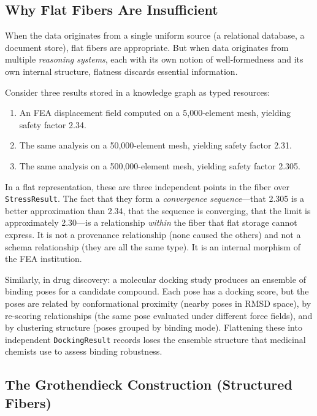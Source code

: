 \documentclass[10pt,twocolumn,letterpaper]{article}
\newcommand{\code}[1]{\texttt{\small #1}}
\begin{document}
\subsection{Why Flat Fibers Are Insufficient}

When the data originates from a single uniform source (a relational database, a document store), flat fibers are appropriate.
But when data originates from multiple \emph{reasoning systems}, each with its own notion of well-formedness and its own internal structure, flatness discards essential information.

Consider three results stored in a knowledge graph as typed resources:

\begin{enumerate}
\item An FEA displacement field computed on a 5{,}000-element mesh, yielding safety factor 2.34.
\item The same analysis on a 50{,}000-element mesh, yielding safety factor 2.31.
\item The same analysis on a 500{,}000-element mesh, yielding safety factor 2.305.
\end{enumerate}

In a flat representation, these are three independent points in the fiber over \code{StressResult}.
The fact that they form a \emph{convergence sequence}---that 2.305 is a better approximation than 2.34, that the sequence is converging, that the limit is approximately 2.30---is a relationship \emph{within} the fiber that flat storage cannot express.
It is not a provenance relationship (none caused the others) and not a schema relationship (they are all the same type).
It is an internal morphism of the FEA institution.

Similarly, in drug discovery: a molecular docking study produces an ensemble of binding poses for a candidate compound.
Each pose has a docking score, but the poses are related by conformational proximity (nearby poses in RMSD space), by re-scoring relationships (the same pose evaluated under different force fields), and by clustering structure (poses grouped by binding mode).
Flattening these into independent \code{DockingResult} records loses the ensemble structure that medicinal chemists use to assess binding robustness.

\subsection{The Grothendieck Construction (Structured Fibers)}
\end{document}
